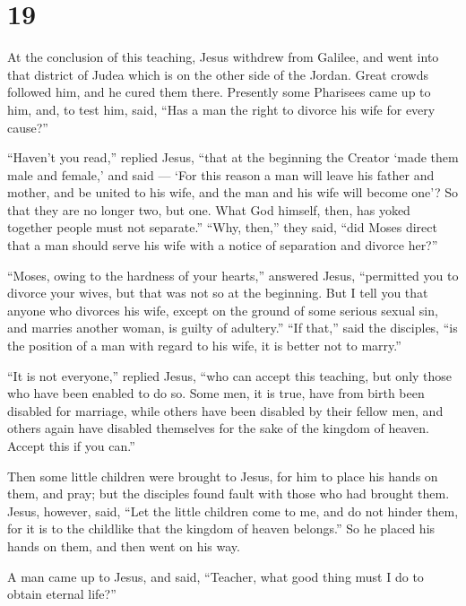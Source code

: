 \hypertarget{section-18}{%
\section{19}\label{section-18}}

 At the conclusion of this teaching, Jesus withdrew from
Galilee, and went into that district of Judea which is on the other side
of the Jordan.  Great crowds followed him, and he cured them
there.  Presently some Pharisees came up to him, and, to
test him, said, ``Has a man the right to divorce his wife for every
cause?''

 ``Haven't you read,'' replied Jesus, ``that at the
beginning the Creator `made them male and female,'  and said
--- `For this reason a man will leave his father and mother, and be
united to his wife, and the man and his wife will become one'?
 So that they are no longer two, but one. What God himself,
then, has yoked together people must not separate.''  ``Why,
then,'' they said, ``did Moses direct that a man should serve his wife
with a notice of separation and divorce her?''

 ``Moses, owing to the hardness of your hearts,'' answered
Jesus, ``permitted you to divorce your wives, but that was not so at the
beginning.  But I tell you that anyone who divorces his
wife, except on the ground of some serious sexual sin, and marries
another woman, is guilty of adultery.''  ``If that,'' said
the disciples, ``is the position of a man with regard to his wife, it is
better not to marry.''

 ``It is not everyone,'' replied Jesus, ``who can accept
this teaching, but only those who have been enabled to do so.
 Some men, it is true, have from birth been disabled for
marriage, while others have been disabled by their fellow men, and
others again have disabled themselves for the sake of the kingdom of
heaven. Accept this if you can.''

 Then some little children were brought to Jesus, for him
to place his hands on them, and pray; but the disciples found fault with
those who had brought them.  Jesus, however, said, ``Let
the little children come to me, and do not hinder them, for it is to the
childlike that the kingdom of heaven belongs.''  So he
placed his hands on them, and then went on his way.

 A man came up to Jesus, and said, ``Teacher, what good
thing must I do to obtain eternal life?''


